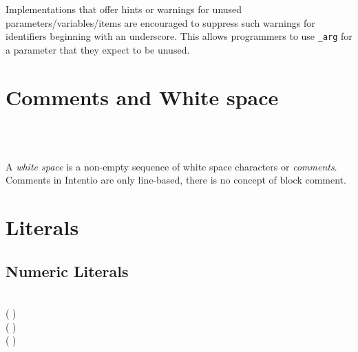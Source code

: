 Implementations that offer hints or warnings for unused parameters/variables/items are encouraged to suppress such warnings for identifiers beginning with an underscore. This allows programmers to use \texttt{\_arg} for a parameter that they expect to be unused.

\section{Comments and White space}

\begin{bnf}
   \eq {} \\
      \eq \term{\#} \  \ 
\end{bnf}

A \emph{white space} is a non-empty sequence of white space characters or \emph{comments}. Comments in Intentio are only line-based, there is no concept of block comment.

\section{Literals}

\begin{bnf}
   \eq {} \gor {} \gor {} \gor {}
\end{bnf}

\subsection{Numeric Literals}

\begin{bnf}
       \eq {} \  \\
        \eq ( \gor {}) \  \  \\
         \eq ( \gor {}) \  \  \\
   \eq ( \gor {}) \  \  \\
  \\
   \eq {} \gor {} \gor {} \gor {} \\
\end{bnf}

